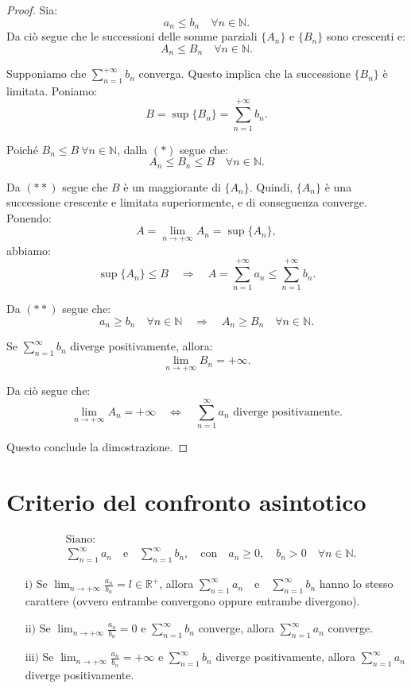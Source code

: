 \documentclass{article}
\begin{document}
\begin{proof}
Sia:
\[
a_n \leq b_n \quad \forall n \in \mathbb{N}.
\]
Da ciò segue che le successioni delle somme parziali \( \{A_n\} \) e \( \{B_n\} \) sono crescenti e:
\[
A_n \leq B_n \quad \forall n \in \mathbb{N}. \tag{*}
\]

\noindent
Supponiamo che \( \sum_{n=1}^{+\infty} b_n \) converga. Questo implica che la successione \( \{B_n\} \) è limitata. Poniamo:
\[
B = \sup \{B_n\} = \sum_{n=1}^{+\infty} b_n.
\]

\noindent
Poiché \( B_n \leq B \ \forall n \in \mathbb{N} \), dalla \((*)\) segue che:
\[
A_n \leq B_n \leq B \quad \forall n \in \mathbb{N}. \tag{**}
\]

\noindent
Da \((**)\) segue che \( B \) è un maggiorante di \( \{A_n\} \). Quindi, \( \{A_n\} \) è una successione crescente e limitata superiormente, e di conseguenza converge. Ponendo:
\[
A = \lim_{n \to +\infty} A_n = \sup \{A_n\},
\]
abbiamo:
\[
\sup \{A_n\} \leq B \quad \Rightarrow \quad A = \sum_{n=1}^{+\infty} a_n \leq \sum_{n=1}^{+\infty} b_n.
\]

\noindent
Da \((**)\) segue che:
\[
a_n \geq b_n \quad \forall n \in \mathbb{N} \quad \Rightarrow \quad A_n \geq B_n \quad \forall n \in \mathbb{N}.
\]

\noindent
Se \( \sum_{n=1}^{\infty} b_n \) diverge positivamente, allora:
\[
\lim_{n \to +\infty} B_n = +\infty.
\]

\noindent
Da ciò segue che:
\[
\lim_{n \to +\infty} A_n = +\infty \quad \Longleftrightarrow \quad \sum_{n=1}^{\infty} a_n \text{ diverge positivamente.}
\]

\noindent
Questo conclude la dimostrazione.
\end{proof}

\section*{Criterio del confronto asintotico}
\begin{align*}
    &\text{Siano:} \\
    &\sum_{n=1}^{\infty} a_n \quad \text{e} \quad \sum_{n=1}^{\infty} b_n, \quad \text{con} \quad a_n \geq 0, \quad b_n > 0 \quad \forall n \in \mathbb{N}.
\end{align*}

\begin{enumerate}
    \item[\( \text{i)} \)] Se 
    \(\lim_{n \to +\infty} \frac{a_n}{b_n} = l \in \mathbb{R}^+\), allora 
    \(\sum_{n=1}^{\infty} a_n \quad \text{e} \quad \sum_{n=1}^{\infty} b_n\) 
    hanno lo stesso carattere (ovvero entrambe convergono oppure entrambe divergono).

    \item[\( \text{ii)} \)] Se 
    \(\lim_{n \to +\infty} \frac{a_n}{b_n} = 0\) e 
    \(\sum_{n=1}^{\infty} b_n\) converge, allora 
    \(\sum_{n=1}^{\infty} a_n\) converge.

    \item[\( \text{iii)} \)] Se 
    \(\lim_{n \to +\infty} \frac{a_n}{b_n} = +\infty\) e 
    \(\sum_{n=1}^{\infty} b_n\) diverge positivamente, allora 
    \(\sum_{n=1}^{\infty} a_n\) diverge positivamente.
\end{enumerate}
\end{document}

